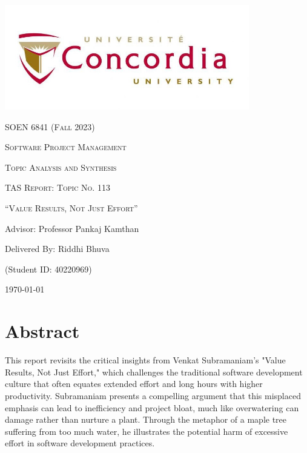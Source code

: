 \documentclass{article}
\begin{document}
\begin{titlepage}
    \centering
    \includegraphics[width=0.8\textwidth]{image.jpeg}\par %
     \vspace{2cm}
    {\scshape\Large SOEN 6841 (Fall 2023) \par}
    \vspace{1cm}
    {\scshape\Large Software Project Management \par}
    \vspace{1cm}
    {\scshape\Large Topic Analysis and Synthesis \par}
    \vspace{1cm}
    {\scshape\Large TAS Report: Topic No. 113 \par}
    \vspace{2cm}
    {\scshape\Huge “Value Results, Not Just Effort”\par}
    \vspace{2cm}
    {\large Advisor: Professor Pankaj Kamthan\par}
    \vspace{1cm}
    {\large Delivered By: Riddhi Bhuva\par}
    \vspace{0.2cm}
    {\large (Student ID: 40220969)\par}
    \vspace{1cm}
    {\large \today\par}
\end{titlepage}

\tableofcontents

\newpage

\section{Abstract}
This report revisits the critical insights from Venkat Subramaniam’s "Value Results, Not Just Effort," which challenges the traditional software development culture that often equates extended effort and long hours with higher productivity. Subramaniam presents a compelling argument that this misplaced emphasis can lead to inefficiency and project bloat, much like overwatering can damage rather than nurture a plant. Through the metaphor of a maple tree suffering from too much water, he illustrates the potential harm of excessive effort in software development practices.\\
\end{document}
